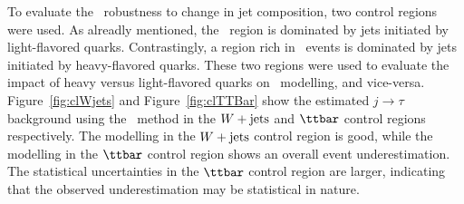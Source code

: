 \par To evaluate the \FF\ robustness to change in jet composition, two 
control regions were used. As alreadly mentioned, the \Wjets\ region is dominated by jets initiated 
by light-flavored quarks. Contrastingly, a region rich in \ttbar\ events is dominated by 
jets initiated by heavy-flavored quarks. These two regions were used to evaluate the impact of 
heavy versus light-flavored quarks on \FF\ modelling, and vice-versa. Figure~\ref{fig:clWjets} and Figure~\ref{fig:clTTBar}
show the estimated $j\to\tau$ background using the \FF\ method  in the $W+\text{jets}$ and $\ttbar$ control 
regions respectively. The modelling in the $W+\text{jets}$ control region is good, while the modelling in the 
$\ttbar$ control region shows an overall event underestimation. The statistical uncertainties in the 
$\ttbar$ control region are larger, indicating that the observed underestimation may be 
statistical in nature.   

